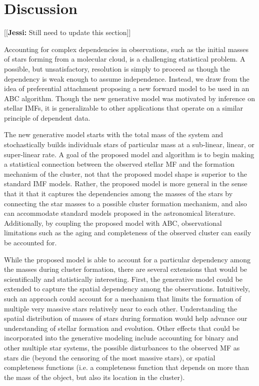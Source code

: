 \documentclass[12pt]{article}
\newcommand{\jessi}[1]{{\color{blue}[[\textbf{Jessi: }#1]]}}
\begin{document}
\section{Discussion}
\label{discussionSec}

\jessi{Still need to update this section}

Accounting for complex dependencies in observations, such as the initial masses of stars forming from a molecular cloud, is a challenging statistical problem.  A possible, but unsatisfactory, resolution is simply to proceed as though the dependency is weak enough to assume independence.  Instead, we draw from the idea of preferential attachment proposing a new forward model to be used in an ABC algorithm.  
Though the new generative model was motivated by inference on stellar IMFs, it is generalizable to other applications that operate on a similar principle of dependent data.

The new generative model starts with the total mass of the system and stochastically builds individuals stars of particular mass at a sub-linear, linear, or super-linear rate.  
%
A goal of the proposed model and algorithm is to begin making a statistical connection between the observed stellar MF and the formation mechanism of the cluster, not that the proposed model shape is superior to the standard IMF models.  Rather, the proposed model is more general in the sense that it 
 that it captures the dependencies among the masses of the stars by connecting the star masses to a possible cluster formation mechanism, and also can accommodate standard models proposed in the astronomical literature.
Additionally, by coupling the proposed model with ABC, observational limitations such as the aging and completeness of the observed cluster can easily be accounted for.


While the proposed model is able to account for a particular dependency among the masses during cluster formation, there are several extensions that would be scientifically and statistically interesting.   First, the generative model could be extended to capture the spatial dependency among the observations.
Intuitively, such an approach could account for a mechanism that limits the formation of multiple very massive stars relatively near to each other.  
%
Understanding the spatial distribution of masses of stars during formation would help advance our understanding of stellar formation and evolution.  
%
Other effects that could be incorporated into the generative modeling include accounting for binary and other multiple star systems, the possible disturbances to the observed MF as stars die (beyond the censoring of the most massive stars), or spatial completeness functions (i.e. a completeness function that depends on more than the mass of the object, but also its location in the cluster).  
\end{document}
